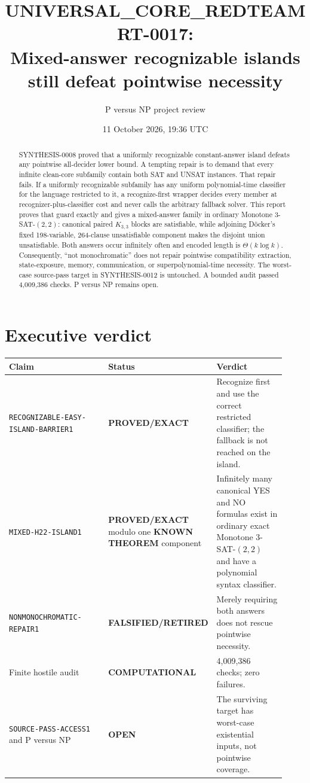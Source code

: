 \documentclass[11pt]{article}
\title{UNIVERSAL\_CORE\_REDTEAM RT-0017:\\
Mixed-answer recognizable islands still defeat pointwise necessity}
\author{P versus NP project review}
\date{11 October 2026, 19:36 UTC}
\newcommand{\EXACT}{\textbf{PROVED/EXACT}}
\newcommand{\KNOWN}{\textbf{KNOWN THEOREM}}
\newcommand{\OPEN}{\textbf{OPEN}}
\newcommand{\RETIRED}{\textbf{FALSIFIED/RETIRED}}
\newcommand{\COMP}{\textbf{COMPUTATIONAL}}
\begin{document}
\maketitle

\begin{abstract}
SYNTHESIS-0008 proved that a uniformly recognizable constant-answer island
defeats any pointwise all-decider lower bound.  A tempting repair is to demand
that every infinite clean-core subfamily contain both SAT and UNSAT instances.
That repair fails.  If a uniformly recognizable subfamily has any uniform
polynomial-time classifier for the language restricted to it, a recognize-first
wrapper decides every member at recognizer-plus-classifier cost and never calls
the arbitrary fallback solver.  This report proves that guard exactly and gives
a mixed-answer family in ordinary Monotone 3-SAT-$(2,2)$: canonical paired
$K_{3,3}$ blocks are satisfiable, while adjoining D\"ocker's fixed 198-variable,
264-clause unsatisfiable component makes the disjoint union unsatisfiable.  Both
answers occur infinitely often and encoded length is $\Theta(k\log k)$.
Consequently, ``not monochromatic'' does not repair pointwise compatibility
extraction, state-exposure, memory, communication, or superpolynomial-time
necessity.  The worst-case source-pass target in SYNTHESIS-0012 is untouched.
A bounded audit passed 4,009,386 checks.  P versus NP remains open.
\end{abstract}

\section{Executive verdict}

\begin{center}\small
\begin{tabular}{@{}p{0.42\linewidth}p{0.18\linewidth}p{0.32\linewidth}@{}}
\toprule
Claim & Status & Verdict\\ \midrule
\texttt{RECOGNIZABLE-EASY-ISLAND-BARRIER1} & \EXACT &
Recognize first and use the correct restricted classifier; the fallback is not
reached on the island.\\
\texttt{MIXED-H22-ISLAND1} & \EXACT{} modulo one \KNOWN{} component &
Infinitely many canonical YES and NO formulas exist in ordinary exact
Monotone 3-SAT-$(2,2)$ and have a polynomial syntax classifier.\\
\texttt{NONMONOCHROMATIC-REPAIR1} & \RETIRED &
Merely requiring both answers does not rescue pointwise necessity.\\
Finite hostile audit & \COMP & 4,009,386 checks; zero failures.\\
\texttt{SOURCE-PASS-ACCESS1} and P versus NP & \OPEN &
The surviving target has worst-case existential inputs, not pointwise coverage.\\
\bottomrule
\end{tabular}
\end{center}
\end{document}
